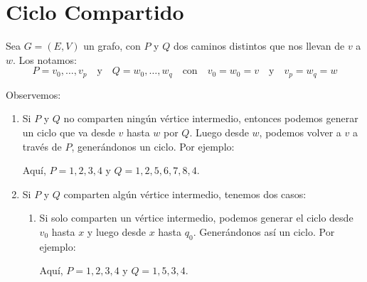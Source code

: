 \documentclass{article}
\begin{document}
\section{Ciclo Compartido}
Sea $G = (E,V)$ un grafo, con $P$ y $Q$ dos caminos distintos que nos llevan de $v$ a $w$. Los notamos:
\[ P = v_0, \ldots, v_p \quad \text{y} \quad Q = w_0, \ldots, w_q \quad \text{con} \quad v_0 = w_0 = v \quad \text{y} \quad v_p = w_q = w \]

Observemos:

\begin{enumerate}
    \item Si $P$ y $Q$ no comparten ningún vértice intermedio, entonces podemos generar un ciclo que va desde $v$ hasta $w$ por $Q$. Luego desde $w$, podemos volver a $v$ a través de $P$, generándonos un ciclo. Por ejemplo:
    \begin{center}
    \end{center}
    Aquí, $ P = 1,2,3,4$ y $Q = 1,2,5,6,7,8,4$.
    
    \item Si $P$ y $Q$ comparten algún vértice intermedio, tenemos dos casos:
    \begin{enumerate}
        \item Si solo comparten un vértice intermedio, podemos generar el ciclo desde $v_0$ hasta $x$ y luego desde $x$ hasta $q_0$. Generándonos así un ciclo. Por ejemplo:
        \begin{center}
        \end{center}
        Aquí, $P = 1,2,3,4$ y $Q = 1,5,3,4$.
        

\end{enumerate}
\end{enumerate}
\end{document}
